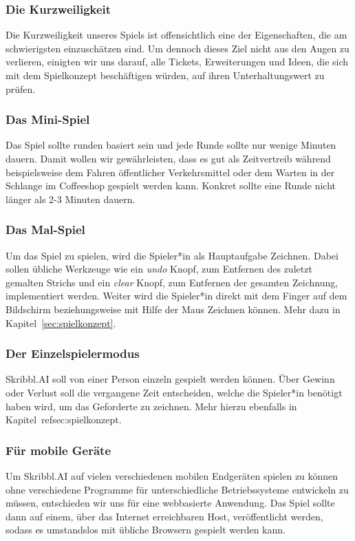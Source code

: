 \documentclass[11pt]{article}
\begin{document}
\subsubsection{Die Kurzweiligkeit}
Die Kurzweiligkeit unseres Spiels ist offensichtlich eine der Eigenschaften, die am schwierigsten einzuschätzen sind. Um dennoch dieses Ziel nicht aus den Augen zu verlieren, einigten wir uns darauf, alle Tickets, Erweiterungen und Ideen, die sich mit dem Spielkonzept beschäftigen würden, auf ihren Unterhaltungswert zu prüfen.
\subsubsection{Das Mini-Spiel}
Das Spiel sollte runden basiert sein und jede Runde sollte nur wenige Minuten dauern. Damit wollen wir gewährleisten, dass es gut als Zeitvertreib während beispielsweise dem Fahren öffentlicher Verkehrsmittel oder dem Warten in der Schlange im Coffeeshop gespielt werden kann. Konkret sollte eine Runde nicht länger als 2-3 Minuten dauern.
\subsubsection{Das Mal-Spiel}
Um das Spiel zu spielen, wird die Spieler*in als Hauptaufgabe Zeichnen. Dabei sollen übliche Werkzeuge wie ein \textit{undo} Knopf, zum Entfernen des zuletzt gemalten Strichs und ein \textit{clear} Knopf, zum Entfernen der gesamten Zeichnung, implementiert werden. Weiter wird die Spieler*in direkt mit dem Finger auf dem Bildschirm beziehungsweise mit Hilfe der Maus Zeichnen können. Mehr dazu in Kapitel~\ref{sec:spielkonzept}.
\subsubsection{Der Einzelspielermodus}
Skribbl.AI soll von einer Person einzeln gespielt werden können. Über Gewinn oder Verlust soll die vergangene Zeit entscheiden, welche die Spieler*in benötigt haben wird, um das Geforderte zu zeichnen. Mehr hierzu ebenfalls in Kapitel~ref{sec:spielkonzept}.
\subsubsection{Für mobile Geräte}
Um Skribbl.AI auf vielen verschiedenen mobilen Endgeräten spielen zu können ohne verschiedene Programme für unterschiedliche Betriebssysteme entwickeln zu müssen, entschieden wir uns für eine webbasierte Anwendung. Das Spiel sollte dann auf einem, über das Internet erreichbaren Host, veröffentlicht werden, sodass es umstandslos mit übliche Browsern gespielt werden kann.
\end{document}
